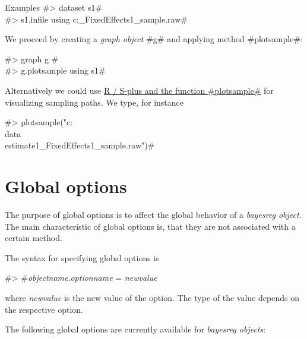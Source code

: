 \begin{stanza}{Examples}
#> dataset s1# \\
#> s1.infile using c:\data{}_FixedEffects1_sample.raw#

We proceed by creating a {\em graph object} #g# and applying
method #plotsample#:

#> graph g #\\
#> g.plotsample using s1#

Alternatively we could use \hyperref[splusplotsample]{R / S-plus and
the function #plotsample#} for visualizing sampling paths. We type,
for instance

#> plotsample("c:\\data\\estimate1_FixedEffects1_sample.raw")#

\end{stanza}

\section{Global options}
\label{bayesregglobopt} 

The purpose of global options is to affect the global behavior of
a {\em bayesreg object}. The main characteristic of global options
is, that they are not associated with a certain method.

The syntax for specifying global options is

#> #{\em objectname}.{\em optionname} = {\em newvalue}

where {\em newvalue} is the new value of the option. The type of
the value depends on the respective option.

The following global options are currently available for {\em
bayesreg objects}:


